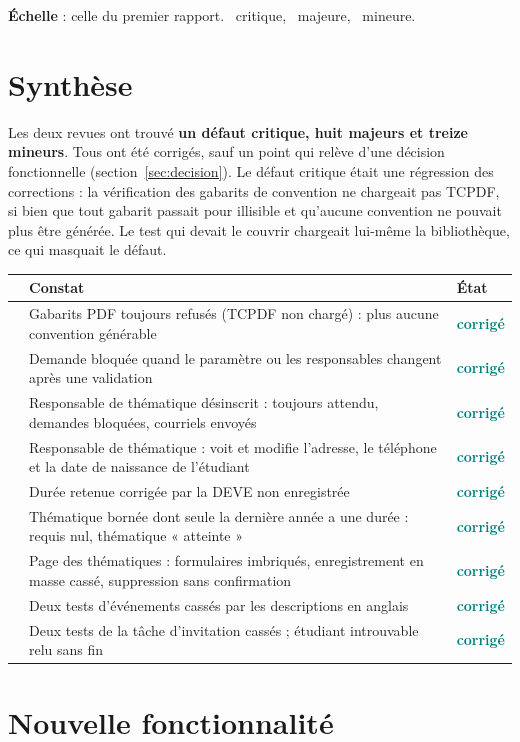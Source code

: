 \documentclass[11pt,a4paper]{article}
\newcommand{\grav}[1]{\textbf{\textcolor{#1}{\textbullet}}}
\newcommand{\maj}{\grav{orange}}
\newcommand{\mineure}{\grav{gray}}
\newcommand{\crit}{\grav{red}}
\newcommand{\ok}{\textcolor{teal}{\textbf{corrigé}}}
\begin{document}
\noindent\textbf{Échelle} : celle du premier rapport. \crit~critique, \maj~majeure,
\mineure~mineure.

\section{Synthèse}

Les deux revues ont trouvé \textbf{un défaut critique, huit majeurs et treize mineurs}. Tous ont
été corrigés, sauf un point qui relève d'une décision fonctionnelle (section~\ref{sec:decision}).
Le défaut critique était une régression des corrections : la vérification des gabarits de
convention ne chargeait pas TCPDF, si bien que tout gabarit passait pour illisible et qu'aucune
convention ne pouvait plus être générée. Le test qui devait le couvrir chargeait lui-même la
bibliothèque, ce qui masquait le défaut.

\begin{center}
\small
\begin{tabularx}{\linewidth}{@{}l X l@{}}
\toprule
& \textbf{Constat} & \textbf{État} \\
\midrule
\crit & Gabarits PDF toujours refusés (TCPDF non chargé) : plus aucune convention générable & \ok \\
\maj & Demande bloquée quand le paramètre ou les responsables changent après une validation & \ok \\
\maj & Responsable de thématique désinscrit : toujours attendu, demandes bloquées, courriels envoyés & \ok \\
\maj & Responsable de thématique : voit et modifie l'adresse, le téléphone et la date de naissance de l'étudiant & \ok \\
\maj & Durée retenue corrigée par la DEVE non enregistrée & \ok \\
\maj & Thématique bornée dont seule la dernière année a une durée : requis nul, thématique « atteinte » & \ok \\
\maj & Page des thématiques : formulaires imbriqués, enregistrement en masse cassé, suppression sans confirmation & \ok \\
\maj & Deux tests d'événements cassés par les descriptions en anglais & \ok \\
\maj & Deux tests de la tâche d'invitation cassés ; étudiant introuvable relu sans fin & \ok \\
\bottomrule
\end{tabularx}
\end{center}

\section{Nouvelle fonctionnalité}
\end{document}
